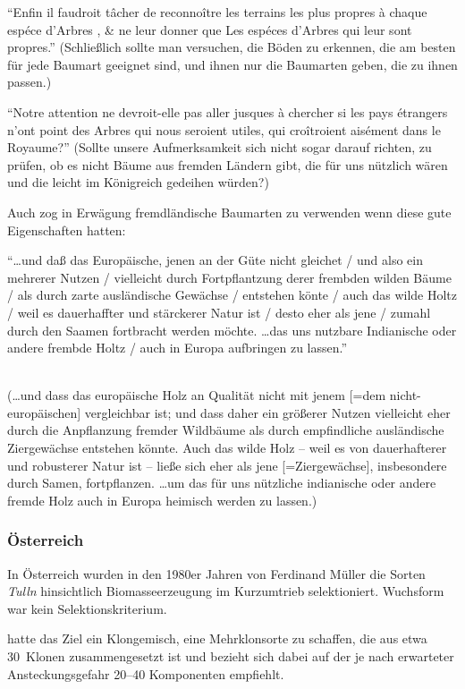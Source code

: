 \documentclass[twocolumn]{scrartcl}
\begin{document}
\enquote{Enfin il faudroit tâcher de reconnoître les terrains les plus  propres à chaque espéce d’Arbres , \& ne leur donner que Les espéces d’Arbres qui leur sont propres.} (Schließlich sollte man versuchen, die Böden zu erkennen, die am besten für jede Baumart geeignet sind, und ihnen nur die Baumarten geben, die zu ihnen passen.)

\enquote{Notre attention ne devroit-elle pas aller jusques à chercher si les pays étrangers n'ont point des Arbres qui nous seroient utiles, qui croîtroient aisément dans le Royaume?} (Sollte unsere Aufmerksamkeit sich nicht sogar darauf richten, zu prüfen, ob es nicht Bäume aus fremden Ländern gibt, die für uns nützlich wären und die leicht im Königreich gedeihen würden?)

Auch \citet[S.~253]{carlowitz1713sylvicultura} zog in Erwägung
fremdländische Baumarten zu verwenden wenn diese gute Eigenschaften
hatten:

\hypertarget{german:carlowitz1713sylvicultura}{\enquote{\dots und daß das Europäische, jenen an der Güte nicht gleichet / und also ein mehrerer Nutzen / vielleicht durch Fortpflantzung derer frembden wilden Bäume / als durch zarte ausländische Gewächse / entstehen könte / auch das wilde Holtz / weil es dauerhaffter  und stärckerer Natur ist / desto eher als jene / zumahl durch den Saamen fortbracht werden möchte.  \dots  das uns nutzbare Indianische oder andere frembde Holtz / auch in Europa aufbringen zu lassen.}}\\
(\dots und dass das europäische Holz an Qualität nicht mit jenem [=dem nicht-europäischen] vergleichbar ist; und dass daher ein größerer Nutzen vielleicht eher durch die Anpflanzung fremder Wildbäume als durch empfindliche ausländische Ziergewächse entstehen könnte. Auch das wilde Holz – weil es von dauerhafterer und robusterer Natur ist – ließe sich eher als jene [=Ziergewächse], insbesondere durch Samen, fortpflanzen. \dots um das für uns nützliche indianische oder andere fremde Holz auch in Europa heimisch werden zu lassen.)

\subsubsection{Österreich}

In Österreich wurden in den 1980er Jahren von Ferdinand Müller die
Sorten \emph{Tulln} hinsichtlich Biomasseerzeugung im Kurzumtrieb
selektioniert. Wuchsform war kein Selektionskriterium.

\citet{mueller1999robinie} hatte das Ziel ein Klongemisch, eine
Mehrklonsorte zu schaffen, die aus etwa 30~Klonen zusammengesetzt ist
und bezieht sich dabei auf \citet{huehn1986klonanazahl} der je nach
erwarteter Ansteckungsgefahr 20--40 Komponenten empfiehlt.
\end{document}
